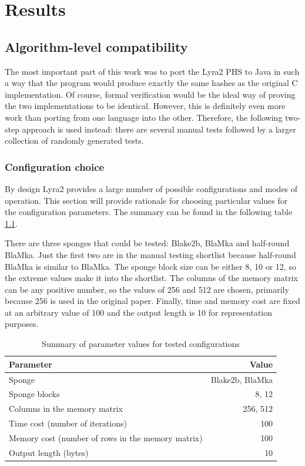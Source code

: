 \chapter{Results}
\label{sec:results}

\section{Algorithm-level compatibility}

The most important part of this work was to port the Lyra2 PHS to Java in such a way that the program would produce exactly the same hashes as the original C implementation. Of course, formal verification would be the ideal way of proving the two implementations to be identical. However, this is definitely even more work than porting from one language into the other. Therefore, the following two-step approach is used instead: there are several manual tests followed by a larger collection of randomly generated tests.

\subsection{Configuration choice}
By design Lyra2 provides a large number of possible configurations and modes of operation. This section will provide rationale for choosing particular values for the configuration parameters. The summary can be found in the following table \ref{table:configuration-summary}.

There are three sponges that could be tested: Blake2b, BlaMka and half-round BlaMka. Just the first two are in the manual testing shortlist because half-round BlaMka is similar to BlaMka. The sponge block size can be either 8, 10 or 12, so the extreme values make it into the shortlist. The columns of the memory matrix can be any positive number, so the values of 256 and 512 are chosen, primarily because 256 is used in the original paper. Finally, time and memory cost are fixed at an arbitrary value of 100 and the output length is 10 for representation purposes.

\begin{table}
\begin{center}
\begin{tabular}{l r}
Parameter & Value \\ \hline
Sponge & Blake2b, BlaMka \\
Sponge blocks & 8, 12 \\
Columns in the memory matrix & 256, 512 \\
Time cost (number of iterations) & 100 \\
Memory cost (number of rows in the memory matrix) & 100 \\
Output length (bytes) & 10 \\
\end{tabular}
\end{center}
\caption{Summary of parameter values for tested configurations}
\label{table:configuration-summary}
\end{table}

